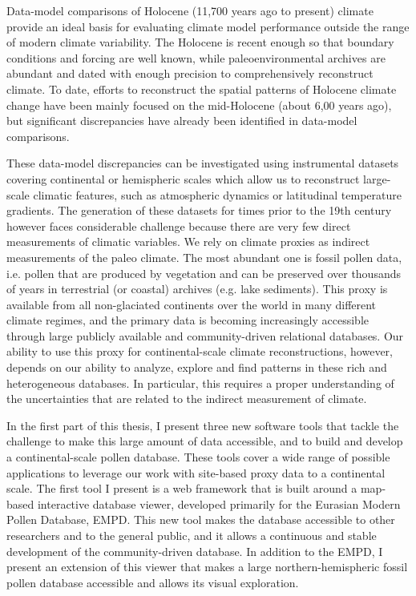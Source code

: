 \begin{thesisabstract}[]
\addchaptertocentry{\abstractname} %
Data-model comparisons of Holocene (11,700 years ago to present) climate provide an ideal basis for evaluating climate model performance outside the range of modern climate variability. The Holocene  is recent enough so that boundary conditions and forcing are well known, while paleoenvironmental archives are abundant and dated with enough precision to comprehensively reconstruct climate. To date, efforts to reconstruct the spatial patterns of Holocene climate change have been mainly focused on the mid-Holocene (about 6,00 years ago), but significant discrepancies have already been identified in data-model comparisons.

These data-model discrepancies can be investigated using instrumental datasets covering continental or hemispheric scales which allow us to reconstruct large-scale climatic features, such as atmospheric dynamics or latitudinal temperature gradients. The generation of these datasets for times prior to the 19th century however faces considerable challenge because there are very few direct measurements of climatic variables. We rely on climate proxies as indirect measurements of the paleo climate. The most abundant one is fossil pollen data, i.e. pollen that are produced by vegetation and can be preserved over thousands of years in terrestrial (or coastal) archives (e.g. lake sediments). This proxy is available from all non-glaciated continents over the world in many different climate regimes, and the primary data is becoming increasingly accessible through large publicly available and community-driven relational databases. Our ability to use this proxy for continental-scale climate reconstructions, however, depends on our ability to analyze, explore and find patterns in these rich and heterogeneous databases. In particular, this requires a proper understanding of the uncertainties that are related to the indirect measurement of climate.

In the first part of this thesis, I present three new software tools that tackle the challenge to make this large amount of data accessible, and to build and develop a continental-scale pollen database. These tools cover a wide range of possible applications to leverage our work with site-based proxy data to a continental scale.
The first tool I present is a web framework that is built around a map-based interactive database viewer, developed primarily for the Eurasian Modern Pollen Database, EMPD. This new tool makes the database accessible to other researchers and to the general public, and it allows a continuous and stable development of the community-driven database. In addition to the EMPD, I present an extension of this viewer that makes a large northern-hemispheric fossil pollen database accessible and allows its visual exploration.


\end{thesisabstract}
